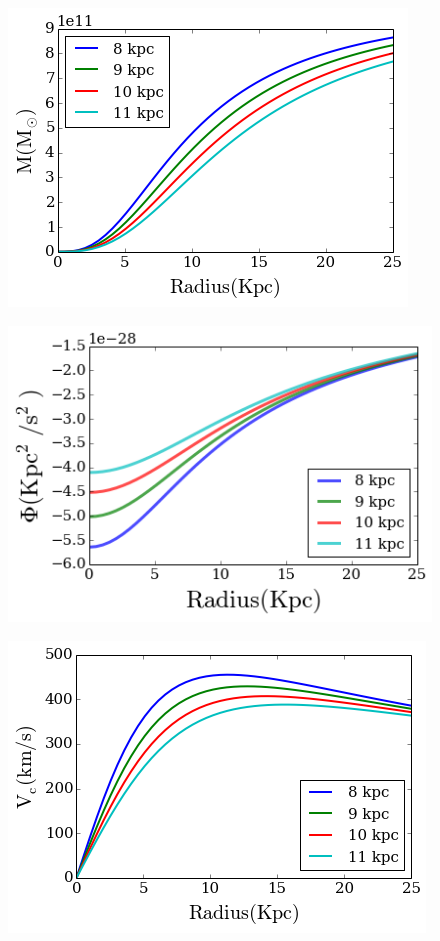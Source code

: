 \documentclass[a4paper, 12pt]{article} %
\begin{document}
\begin{figure}[H]
\centering
\includegraphics[scale=0.7]{plummer_mass.png}
\end{figure}

\begin{figure}[H]
\centering
\includegraphics[scale=0.7]{plummer_phi.png}
\end{figure}

\begin{figure}[H]
\centering
\includegraphics[scale=0.7]{plummer_velocity.png}
\end{figure}
\end{document}
